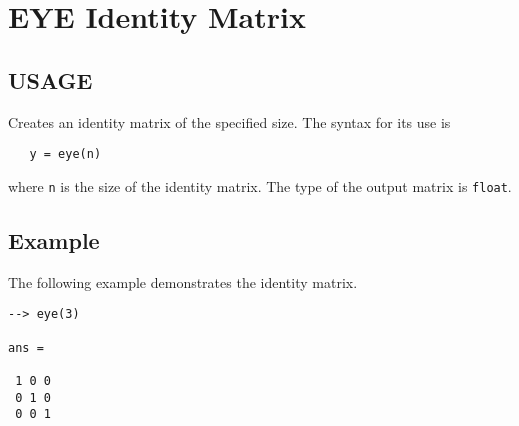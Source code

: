 \section{EYE Identity Matrix}

\subsection{USAGE}

Creates an identity matrix of the specified size.  The syntax for
its use is
\begin{verbatim}
   y = eye(n)
\end{verbatim}
where \verb|n| is the size of the identity matrix.  The type of the 
output matrix is \verb|float|.
\subsection{Example}

The following example demonstrates the identity matrix.
\begin{verbatim}
--> eye(3)

ans = 

 1 0 0 
 0 1 0 
 0 0 1 
\end{verbatim}
